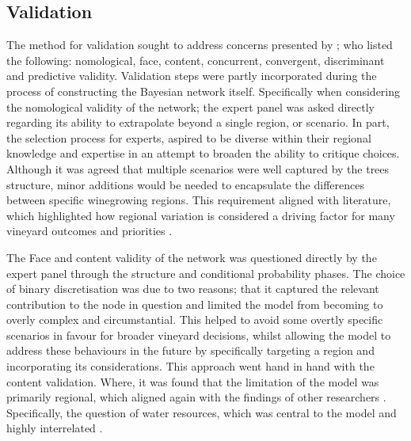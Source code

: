 \subsection{Validation}

The method for validation sought to address concerns presented by \citep{pitchforthProposedValidationFramework2013}; who listed the following:  nomological, face, content, concurrent, convergent, discriminant and predictive validity. Validation steps were partly incorporated during the process of constructing the Bayesian network itself. Specifically when considering the nomological validity of the network; the expert panel was asked directly regarding its ability to extrapolate beyond a single region, or scenario. In part, the selection process for experts, aspired to be diverse within their regional knowledge and expertise in an attempt to broaden the ability to critique choices. Although it was agreed that multiple scenarios were well captured by the trees structure, minor additions would be needed to encapsulate the differences between specific winegrowing regions. This requirement aligned with literature, which highlighted how regional variation is considered a driving factor for many vineyard outcomes and priorities \citep{abbalDecisionSupportSystem2016,agostaRegionalClimateVariability2012,soarClimateDriversRed2008}.

The Face and content validity of the network was questioned directly by the expert panel through the structure and conditional probability phases. The choice of binary discretisation was due to two reasons; that it captured the relevant contribution to the node in question and limited the model from becoming to overly complex and circumstantial. This helped to avoid some overtly specific scenarios in favour for broader vineyard decisions, whilst allowing the model to address these behaviours in the future by specifically targeting a region and incorporating its considerations. This approach went hand in hand with the content validation. Where, it was found that the limitation of the model was primarily regional, which aligned again with the findings of other researchers \citep{abbalDecisionSupportSystem2016,ellisUsingBayesianGrowth2020,agostaRegionalClimateVariability2012,barriguinhaVineyardYieldEstimation2021,brockRelationSoilOrganic2011}. Specifically, the question of water resources, which was central to the model and highly interrelated \citep{carmonaUseParticipatoryObjectOriented2011}.

